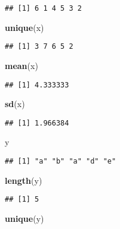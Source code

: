 \documentclass[
  a4paper,
]{article}
\newenvironment{Shaded}{\begin{snugshade}}{\end{snugshade}}
\newcommand{\FunctionTok}[1]{\textcolor[rgb]{0.13,0.29,0.53}{\textbf{#1}}}
\newcommand{\NormalTok}[1]{#1}
\begin{document}
\begin{verbatim}
## [1] 6 1 4 5 3 2
\end{verbatim}

\begin{Shaded}
\begin{Highlighting}[]
\FunctionTok{unique}\NormalTok{(x)}
\end{Highlighting}
\end{Shaded}

\begin{verbatim}
## [1] 3 7 6 5 2
\end{verbatim}

\begin{Shaded}
\begin{Highlighting}[]
\FunctionTok{mean}\NormalTok{(x)}
\end{Highlighting}
\end{Shaded}

\begin{verbatim}
## [1] 4.333333
\end{verbatim}

\begin{Shaded}
\begin{Highlighting}[]
\FunctionTok{sd}\NormalTok{(x)}
\end{Highlighting}
\end{Shaded}

\begin{verbatim}
## [1] 1.966384
\end{verbatim}

\begin{Shaded}
\begin{Highlighting}[]
\NormalTok{y}
\end{Highlighting}
\end{Shaded}

\begin{verbatim}
## [1] "a" "b" "a" "d" "e"
\end{verbatim}

\begin{Shaded}
\begin{Highlighting}[]
\FunctionTok{length}\NormalTok{(y)}
\end{Highlighting}
\end{Shaded}

\begin{verbatim}
## [1] 5
\end{verbatim}

\begin{Shaded}
\begin{Highlighting}[]
\FunctionTok{unique}\NormalTok{(y)}
\end{Highlighting}
\end{Shaded}
\end{document}
